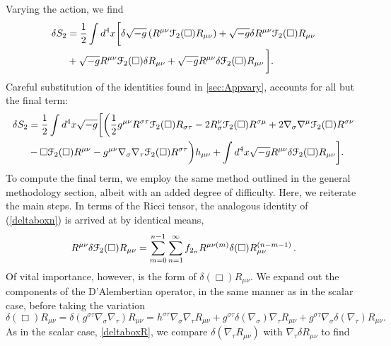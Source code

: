 Varying the action, we find
\begin{align}
\delta S_{2}	&=\frac{1}{2}\int d^{4}x\biggl[\delta\sqrt{-g}\left(R^{\mu\nu}{\cal F}_{2}(\Box)R_{\mu\nu}\right)+\sqrt{-g}\delta R^{\mu\nu}{\cal F}_{2}(\Box)R_{\mu\nu}
\nonumber\\&+\sqrt{-g}R^{\mu\nu}{\cal F}_{2}(\Box)\delta R_{\mu\nu}
	+\sqrt{-g}R^{\mu\nu}\delta{\cal F}_{2}(\Box)R_{\mu\nu}\,\biggr].
\end{align}
Careful substitution of the identities found in \ref{sec:Appvary}, accounts for all but the final term:
\begin{align}
\delta S_{2}	&=	\frac{1}{2}\int d^{4}x\sqrt{-g}\biggl[\biggl(\frac{1}{2}g^{\mu\nu}R^{\sigma\tau}{\cal F}_{2}(\Box)R_{\sigma\tau}-2R_{\sigma}^{\nu}{\cal F}_{2}(\Box)R^{\sigma\mu}+2\nabla_{\sigma}\nabla^{\mu}{\cal F}_{2}(\Box)R^{\sigma\nu}
		\nonumber\\&
		-\square{\cal F}_{2}(\Box)R^{\mu\nu}-g^{\mu\nu}\nabla_{\sigma}\nabla_{\tau}{\cal F}_{2}(\Box)R^{\sigma\tau}\biggl)h_{\mu\nu}+\int d^{4}x\sqrt{-g}R^{\mu\nu}\delta{\cal F}_{2}(\Box)R_{\mu\nu}\biggr].
 \label{varys3}
\end{align}
To compute the final term, we employ the same method outlined in the general methodology section, albeit with an added degree of difficulty. Here, we reiterate the main steps. In terms of the Ricci tensor, the analogous identity of (\ref{deltaboxn}) is arrived at by identical means,
\begin{equation}
\label{deltaFRuv}
R^{\mu\nu}\delta{\cal F}_2(\Box)R_{\mu\nu}=\sum_{m=0}^{
n-1 }
\sum_{n=1}^{\infty}f_{2_n}R^{\mu\nu(m)}\delta(\square)R_{\mu\nu}^{(n-m-1)}\,.
\end{equation}
Of vital importance, however, is the form of $\delta(\Box)R_{\mu\nu}$. We expand out the components of the D'Alembertian operator, in the same manner as in the scalar case, before taking the variation
\begin{equation}
\label{deltaboxRuv1}
\delta(\Box)R_{\mu\nu}=\delta(g^{\sigma\tau}\nabla_\sigma \nabla_\tau)R_{\mu\nu}=h^{\sigma\tau}\nabla_\sigma \nabla_\tau R_{\mu\nu}+g^{\sigma\tau}\delta(\nabla_\sigma)\nabla_\tau R_{\mu\nu}+g^{\sigma\tau}\nabla_\sigma \delta(\nabla_\tau)R_{\mu\nu}.
\end{equation}
As in the scalar case, \eqref{deltaboxR}, we compare $\delta(\nabla_\tau R_{\mu\nu})$ with $\nabla_\tau \delta R_{\mu\nu}$ to find

